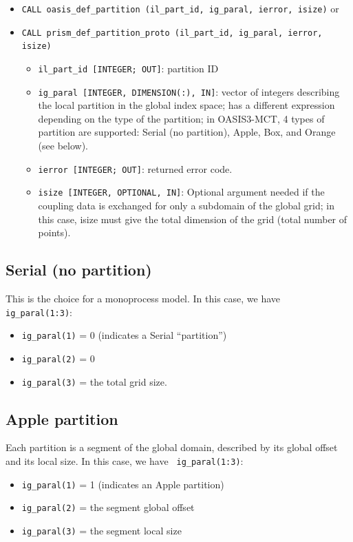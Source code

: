 \begin{itemize}

  \vspace{0.2cm}
\item {\tt CALL oasis\_def\_partition (il\_part\_id, ig\_paral,
    ierror, isize)} or
\item {\tt CALL prism\_def\_partition\_proto (il\_part\_id, ig\_paral,
    ierror, isize)}

  \begin{itemize}
  \item {\tt il\_part\_id [INTEGER; OUT]}: partition ID
  \item {\tt ig\_paral [INTEGER, DIMENSION(:), IN]}: vector of
    integers describing the local partition in the global index space;
    has a different expression depending on the type of the partition;
    in OASIS3-MCT, 4 types of partition are supported: Serial (no
    partition), Apple, Box, and Orange (see below).
  \item {\tt ierror [INTEGER; OUT]}: returned error code.
  \item {\tt isize [INTEGER, OPTIONAL, IN]}: Optional argument needed
    if the coupling data is exchanged for only a subdomain of the
    global grid; in this case, isize must give the total dimension of
    the grid (total number of points).
  \end{itemize}
\end{itemize}

\subsection{Serial (no partition)}

This is the choice for a monoprocess model. In this case, we have {\tt
  ig\_paral(1:3)}:
\begin{itemize}
\item {\tt ig\_paral(1)} = 0 (indicates a Serial ``partition'')
\item {\tt ig\_paral(2)} = 0
\item {\tt ig\_paral(3)} = the total grid size.
\end{itemize}

\subsection{Apple partition}

Each partition is a segment of the global domain, described by its
global offset and its local size. In this case, we have {\tt
  ig\_paral(1:3)}:
\begin{itemize}
\item {\tt ig\_paral(1)} = 1 (indicates an Apple partition)
\item {\tt ig\_paral(2)} = the segment global offset
\item {\tt ig\_paral(3)} = the segment local size
\end{itemize}

